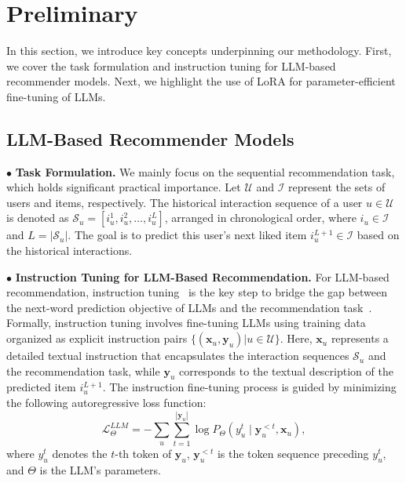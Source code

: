 \section{Preliminary}
In this section, we introduce key concepts underpinning our methodology. First, we cover the task formulation and instruction tuning for LLM-based recommender models. Next, we highlight the use of LoRA for parameter-efficient fine-tuning of LLMs.
\subsection{LLM-Based Recommender Models}
$\bullet$ \quad\textbf{Task Formulation.}
We mainly focus on the sequential recommendation task, which holds significant practical importance. Let $\mathcal{U}$ and $\mathcal{I}$ represent the sets of users and items, respectively. The historical interaction sequence of a user $u \in \mathcal{U}$ is denoted as $\mathcal{S}_u=\left[i_u^1, i_u^2, \ldots, i_u^L\right]$, arranged in chronological order, where $i_u \in \mathcal{I}$ and $L=|\mathcal{S}_u|$. The goal is to predict this user's next liked item $i_u^{L+1} \in \mathcal{I}$ based on the historical interactions.

\noindent$\bullet$ \quad\textbf{Instruction Tuning for LLM-Based Recommendation.}
For LLM-based recommendation, instruction tuning~\cite{wei2022finetuned} is the key step to bridge the gap between the next-word prediction objective of LLMs and the recommendation task~\cite{bao2023tallrec,kong2024customizing,10.1145/3626772.3657807}.
Formally, instruction tuning involves fine-tuning LLMs using training data organized as explicit instruction pairs $\{(\mathbf{x}_u, \mathbf{y}_u)|u \in \mathcal{U}\}$. Here, $\mathbf{x}_u$ represents a detailed textual instruction that encapsulates the interaction sequences $\mathcal{S}_u$ and the recommendation task, while $\mathbf{y}_u$ corresponds to the textual description of the predicted item $i_u^{L+1}$. The instruction fine-tuning process is guided by minimizing the following autoregressive loss function:
\begin{equation}
\mathcal{L}_\Theta^{L L M}=-\sum_{u} \sum_{t=1}^{|\mathbf{y}_u|} \log P_\Theta\left(y_u^t \mid \mathbf{y}^{<t}_u, \mathbf{x}_u\right),
\label{eq:ft}
\end{equation}
where $y^t_u$ denotes the $t$-th token of $\mathbf{y}_u$, $\mathbf{y}^{<t}_u$ is the token sequence preceding $y^t_u$, and $\Theta$ is the LLM's parameters.



